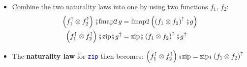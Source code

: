 \begin{itemize}
\begin{itemize}
\item Combine the two naturality laws into one by using two functions $f_{1}$,
$f_{2}$:{\footnotesize{}
\begin{align*}
\left(f_{1}^{\uparrow}\otimes f_{2}^{\uparrow}\right)\bef\text{fmap2}\,g & =\text{fmap2}\left(\left(f_{1}\otimes f_{2}\right)^{\uparrow}\bef g\right)\\
\left(f_{1}^{\uparrow}\otimes f_{2}^{\uparrow}\right)\bef\text{zip}\bef g^{\uparrow} & =\text{zip}\bef\left(f_{1}\otimes f_{2}\right)^{\uparrow}\bef g^{\uparrow}
\end{align*}
}{\footnotesize\par}
\item \vspace{-0.2cm}The \textbf{naturality law} for \texttt{\textcolor{blue}{\footnotesize{}zip}}
then becomes: {\footnotesize{}$\left(f_{1}^{\uparrow}\otimes f_{2}^{\uparrow}\right)\bef\text{zip}=\text{zip}\bef\left(f_{1}\otimes f_{2}\right)^{\uparrow}$} 
\end{itemize}
\end{itemize}


